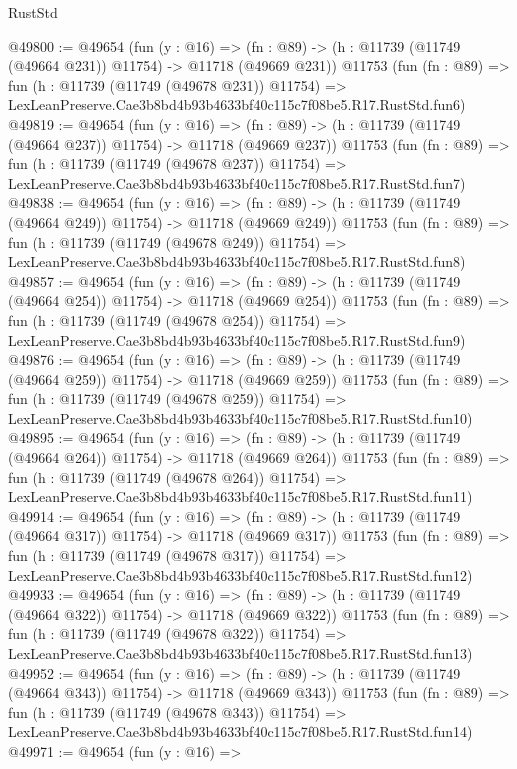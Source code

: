 \begin{lexlean}{RustStd}
\begin{coremodule}
@49800 := @49654
    (fun (y : @16) =>
    (fn : @89) -> (h : @11739 (@11749 (@49664 @231)) @11754) -> @11718 (@49669 @231))
    @11753
    (fun (fn : @89) =>
    fun (h : @11739 (@11749 (@49678 @231)) @11754) =>
    LexLeanPreserve.Cae3b8bd4b93b4633bf40c115c7f08be5.R17.RustStd.fun6)
@49819 := @49654
    (fun (y : @16) =>
    (fn : @89) -> (h : @11739 (@11749 (@49664 @237)) @11754) -> @11718 (@49669 @237))
    @11753
    (fun (fn : @89) =>
    fun (h : @11739 (@11749 (@49678 @237)) @11754) =>
    LexLeanPreserve.Cae3b8bd4b93b4633bf40c115c7f08be5.R17.RustStd.fun7)
@49838 := @49654
    (fun (y : @16) =>
    (fn : @89) -> (h : @11739 (@11749 (@49664 @249)) @11754) -> @11718 (@49669 @249))
    @11753
    (fun (fn : @89) =>
    fun (h : @11739 (@11749 (@49678 @249)) @11754) =>
    LexLeanPreserve.Cae3b8bd4b93b4633bf40c115c7f08be5.R17.RustStd.fun8)
@49857 := @49654
    (fun (y : @16) =>
    (fn : @89) -> (h : @11739 (@11749 (@49664 @254)) @11754) -> @11718 (@49669 @254))
    @11753
    (fun (fn : @89) =>
    fun (h : @11739 (@11749 (@49678 @254)) @11754) =>
    LexLeanPreserve.Cae3b8bd4b93b4633bf40c115c7f08be5.R17.RustStd.fun9)
@49876 := @49654
    (fun (y : @16) =>
    (fn : @89) -> (h : @11739 (@11749 (@49664 @259)) @11754) -> @11718 (@49669 @259))
    @11753
    (fun (fn : @89) =>
    fun (h : @11739 (@11749 (@49678 @259)) @11754) =>
    LexLeanPreserve.Cae3b8bd4b93b4633bf40c115c7f08be5.R17.RustStd.fun10)
@49895 := @49654
    (fun (y : @16) =>
    (fn : @89) -> (h : @11739 (@11749 (@49664 @264)) @11754) -> @11718 (@49669 @264))
    @11753
    (fun (fn : @89) =>
    fun (h : @11739 (@11749 (@49678 @264)) @11754) =>
    LexLeanPreserve.Cae3b8bd4b93b4633bf40c115c7f08be5.R17.RustStd.fun11)
@49914 := @49654
    (fun (y : @16) =>
    (fn : @89) -> (h : @11739 (@11749 (@49664 @317)) @11754) -> @11718 (@49669 @317))
    @11753
    (fun (fn : @89) =>
    fun (h : @11739 (@11749 (@49678 @317)) @11754) =>
    LexLeanPreserve.Cae3b8bd4b93b4633bf40c115c7f08be5.R17.RustStd.fun12)
@49933 := @49654
    (fun (y : @16) =>
    (fn : @89) -> (h : @11739 (@11749 (@49664 @322)) @11754) -> @11718 (@49669 @322))
    @11753
    (fun (fn : @89) =>
    fun (h : @11739 (@11749 (@49678 @322)) @11754) =>
    LexLeanPreserve.Cae3b8bd4b93b4633bf40c115c7f08be5.R17.RustStd.fun13)
@49952 := @49654
    (fun (y : @16) =>
    (fn : @89) -> (h : @11739 (@11749 (@49664 @343)) @11754) -> @11718 (@49669 @343))
    @11753
    (fun (fn : @89) =>
    fun (h : @11739 (@11749 (@49678 @343)) @11754) =>
    LexLeanPreserve.Cae3b8bd4b93b4633bf40c115c7f08be5.R17.RustStd.fun14)
@49971 := @49654
    (fun (y : @16) =>

\end{coremodule}
\end{lexlean}
